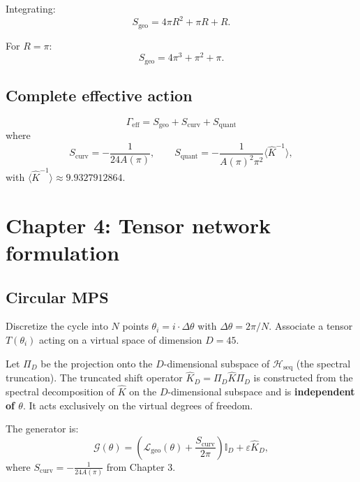 \documentclass[12pt]{article}
\numberwithin{equation}{section}
\begin{document}
Integrating:
\begin{equation}\label{eq:Sgeo}
S_{\text{geo}} = 4\pi R^2 + \pi R + R.
\end{equation}

For \(R = \pi\):
\begin{equation}\label{eq:Sgeo_pi}
S_{\text{geo}} = 4\pi^3 + \pi^2 + \pi.
\end{equation}

\subsection{Complete effective action}

\[
\boxed{\Gamma_{\text{eff}} = S_{\text{geo}} + S_{\text{curv}} + S_{\text{quant}}}
\]
where
\begin{equation}\label{eq:curv}
S_{\text{curv}} = -\frac{1}{24A(\pi)}, \qquad
S_{\text{quant}} = -\frac{1}{A(\pi)^2 \pi^2} \langle \hat K^{-1} \rangle,
\end{equation}
with \(\langle \hat K^{-1} \rangle \approx 9.9327912864\).

\newpage

\section{Chapter 4: Tensor network formulation}

\subsection{Circular MPS}

Discretize the cycle into \(N\) points \(\theta_i = i \cdot \Delta\theta\) with \(\Delta\theta = 2\pi/N\). Associate a tensor \(T(\theta_i)\) acting on a virtual space of dimension \(D = 45\).

Let \(\Pi_D\) be the projection onto the \(D\)-dimensional subspace of \(\mathcal{H}_{\text{seq}}\) (the spectral truncation). The truncated shift operator \(\widehat{K}_D = \Pi_D \hat K \Pi_D\) is constructed from the spectral decomposition of \(\hat K\) on the \(D\)-dimensional subspace and is \textbf{independent of \(\theta\)}. It acts exclusively on the virtual degrees of freedom.

The generator is:
\begin{equation}\label{eq:generator}
\mathcal{G}(\theta) = \left( \mathcal{L}_{\text{geo}}(\theta) + \frac{S_{\text{curv}}}{2\pi} \right) \mathbb{I}_D + \varepsilon \widehat{K}_D,
\end{equation}
where \(S_{\text{curv}} = -\frac{1}{24A(\pi)}\) from Chapter 3.
\end{document}
